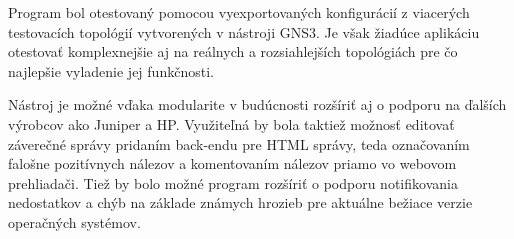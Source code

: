 Program bol otestovaný pomocou vyexportovaných konfigurácií z viacerých testovacích topológií vytvorených v nástroji GNS3. Je však žiadúce aplikáciu otestovať komplexnejšie aj na reálnych a rozsiahlejších topológiách pre čo najlepšie vyladenie jej funkčnosti. 

Nástroj je možné vďaka modularite v budúcnosti rozšíriť aj o podporu na ďalších výrobcov ako Juniper a HP. Využiteľná by bola taktiež možnosť editovať záverečné správy pridaním back-endu pre HTML správy, teda označovaním falošne pozitívnych nálezov a komentovaním nálezov priamo vo webovom prehliadači. Tiež by bolo možné program rozšíriť o podporu notifikovania nedostatkov a chýb na základe známych hrozieb pre aktuálne bežiace verzie operačných systémov.

